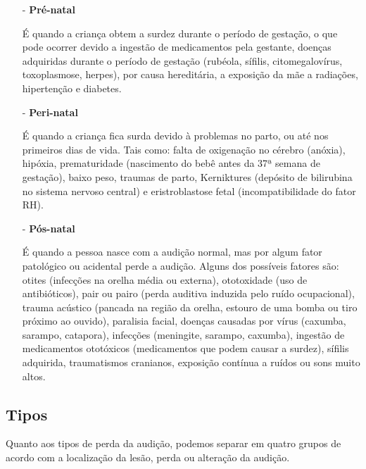 \documentclass[brasil]{abnt}
\begin{document}
				\begin{itemize}		
					\item [-] \textbf{Pré-natal} 
					
						É quando a criança obtem a surdez durante o período de gestação, o que pode ocorrer devido a ingestão de medicamentos pela gestante, doenças adquiridas durante o período de gestação 
						(rubéola, sífilis, citomegalovírus, toxoplasmose, herpes), por causa hereditária, a exposição da mãe a radiações, hipertenção e diabetes.
				
					\item [-]\textbf{Peri-natal} 
					
						É quando a criança fica surda devido à problemas no parto, ou até nos primeiros dias de vida. Tais como: falta de oxigenação no cérebro (anóxia), hipóxia, prematuridade (nascimento do bebê antes da 
						37ª semana de gestação), baixo peso, traumas de parto, Kerniktures (depósito de bilirubina no sistema nervoso central) e eristroblastose fetal (incompatibilidade do fator RH). 
					
					\item [-]\textbf{Pós-natal}	
					
						É quando a pessoa nasce com a audição normal, mas por algum fator patológico ou acidental perde a audição. Alguns dos possíveis fatores são: otites (infecções na orelha média ou externa), 
						ototoxidade (uso de antibióticos), pair ou pairo (perda auditiva induzida pelo ruído ocupacional), trauma acústico (pancada na região da orelha, estouro de uma bomba ou tiro próximo ao ouvido), 
						paralisia facial, doenças causadas por vírus (caxumba, sarampo, catapora), infecções (meningite, sarampo, caxumba), ingestão de medicamentos ototóxicos (medicamentos que podem causar a surdez), 
						sífilis adquirida, traumatismos cranianos, exposição contínua a ruídos ou sons muito altos. 
				
				\end{itemize}
											
			\subsection{Tipos}
				Quanto aos tipos de perda da audição, podemos separar em quatro grupos de acordo com a localização da lesão, perda ou alteração da audição.
				 
\end{document}
